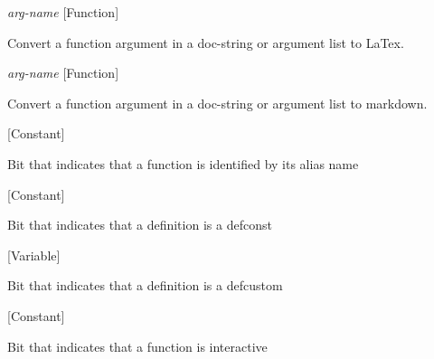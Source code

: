 \vspace{1em}
\noindent
{}
\usebox{\funcname}\emph{arg-name}
 \hfill [Function]

\begin{doc-string}
Convert a function argument in a doc-string or argument list to LaTex.
\end{doc-string}

\vspace{1em}
\noindent
{}
\usebox{\funcname}\emph{arg-name}
 \hfill [Function]

\begin{doc-string}
Convert a function argument in a doc-string or argument list to markdown.
\end{doc-string}

\vspace{1em}
\noindent
{}
\usebox{\funcname}
 \hfill [Constant]

\begin{doc-string}
Bit that indicates that a function is identified by its alias name
\end{doc-string}

\vspace{1em}
\noindent
{}
\usebox{\funcname}
 \hfill [Constant]

\begin{doc-string}
Bit that indicates that a definition is a defconst
\end{doc-string}

\vspace{1em}
\noindent
{}
\usebox{\funcname}
 \hfill [Variable]

\begin{doc-string}
Bit that indicates that a definition is a defcustom
\end{doc-string}

\vspace{1em}
\noindent
{}
\usebox{\funcname}
 \hfill [Constant]

\begin{doc-string}
Bit that indicates that a function is interactive
\end{doc-string}


